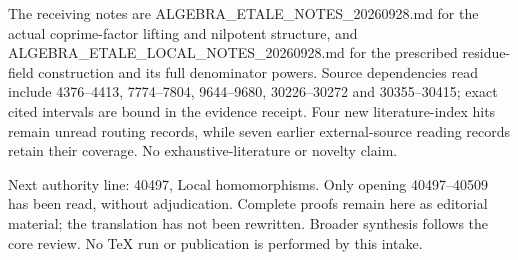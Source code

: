 The receiving notes are ALGEBRA\_ETALE\_NOTES\_20260928.md for the actual coprime-factor lifting and nilpotent structure, and ALGEBRA\_ETALE\_LOCAL\_NOTES\_20260928.md for the prescribed residue-field construction and its full denominator powers. Source dependencies read include 4376--4413, 7774--7804, 9644--9680, 30226--30272 and 30355--30415; exact cited intervals are bound in the evidence receipt. Four new literature-index hits remain unread routing records, while seven earlier external-source reading records retain their coverage. No exhaustive-literature or novelty claim.

Next authority line: 40497, Local homomorphisms. Only opening 40497--40509 has been read, without adjudication. Complete proofs remain here as editorial material; the translation has not been rewritten. Broader synthesis follows the core review. No TeX run or publication is performed by this intake.
